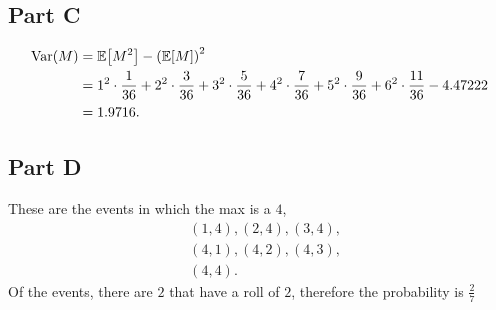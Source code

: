 \documentclass[12pt]{extarticle}
\begin{document}
\subsection*{Part C}
\begin{align*}
	\text{Var}\qty(M) &= \mathbb{E}\qty[M^2] - \qty(\mathbb{E}\qty[M])^2 \\
	&= 1^2\cdot\frac{1}{36} + 2^2\cdot\frac{3}{36} + 3^2\cdot\frac{5}{36} + 4^2\cdot\frac{7}{36} + 5^2\cdot\frac{9}{36} + 6^2\cdot\frac{11}{36} - 4.47222 \\
	&= 1.9716
.\end{align*}

\subsection*{Part D}
These are the events in which the max is a $4$,
\begin{align*}
	&(1,4),
	(2,4),
	(3,4), \\
	&(4,1), 
	(4,2), 
	(4,3), \\
	&(4,4)
.\end{align*}
Of the events, there are $2$ that have a roll of $2$, therefore the probability is $\frac{2}{7}$
\end{document}
